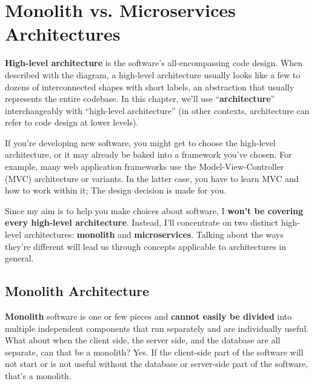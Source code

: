 \yesmargins

\chapter{Monolith vs. Microservices Architectures}


\marginpar{\softwareArchitectureDef\margindivider}

\marginpar{\highLevelArchitectureDef}

\textbf{High-level architecture} is the software's all-encompassing code design. When described with the diagram, a high-level architecture usually looks like a few to dozens of interconnected shapes with short labels, an abstraction that usually represents the entire codebase. In this chapter, we'll use ``\textbf{architecture}'' interchangeably with ``high-level architecture'' (in other contexts, architecture can refer to code design at lower levels).

If you're developing new software, you might get to choose the high-level architecture, or it may already be baked into a framework you've chosen. For example, many web application frameworks use the Model-View-Controller (MVC) architecture or variants. In the latter case, you have to learn MVC and how to work within it; The design decision is made for you.

\marginpar{\monolithArchitectureDef\margindivider}\marginpar{\microservicesArchitectureDef\margindivider}\marginpar{\abstractionDef}Since my aim is to help you make choices about software, I \textbf{won't be covering every high-level architecture}. Instead, I'll concentrate on two distinct high-level architectures: \textbf{monolith} and \textbf{microservices}. Talking about the ways they're different will lead us through concepts applicable to architectures in general.

\section{Monolith Architecture}

\textbf{Monolith} software is one or few pieces and \textbf{cannot easily be divided} into multiple independent components that run separately and are individually useful. What about when the client side, the server side, and the database are all separate, can that be a monolith? Yes. If the client-side part of the software will not start or is not useful without the database or server-side part of the software, that's a monolith.


